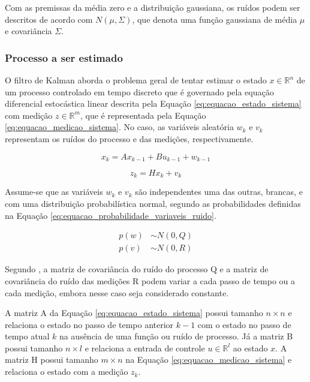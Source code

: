 \documentclass[acronym, symbols, table, deposito]{fei}
\begin{document}
				Com as premissas da média zero e a distribuição gaussiana, os ruídos podem ser descritos de acordo com $N(\mu,\Sigma)$, que denota uma função gaussiana de média $\mu$ e covariância $\Sigma$.
		
		\subsubsection{Processo a ser estimado}
		
			O filtro de Kalman aborda o problema geral de tentar estimar o estado $x \in \mathbb{R}^n$ de um processo controlado em tempo discreto que é governado pela equação diferencial estocástica linear descrita pela Equação \eqref{eq:equacao_estado_sistema} com medição $z \in \mathbb{R}^m$, que é representada pela Equação \eqref{eq:equacao_medicao_sistema}. No caso, as variáveis aleatória $w_k$ e $v_k$ representam os ruídos do processo e das medições, respectivamente.
			
			\begin{equation} \label{eq:equacao_estado_sistema}
				x_k = Ax_{k-1} + Bu_{k-1} + w_{k-1}
			\end{equation}
		
			\begin{equation} \label{eq:equacao_medicao_sistema}
				z_k = Hx_k + v_k
			\end{equation}
		
			Assume-se que as variáveis $w_k$ e $v_k$ são independentes uma das outras, brancas, e com uma distribuição probabilística normal, segundo as probabilidades definidas na Equação \eqref{eq:equacao_probabilidade_variaveis_ruido}.
			
			\begin{equation} \label{eq:equacao_probabilidade_variaveis_ruido}
				\begin{split}
					p(w) &\sim N(0, Q) \\
					p(v) &\sim N(0, R)
				\end{split}
			\end{equation}
		
			Segundo \textcite{welch1995introduction}, a matriz de covariância do ruído do processo Q e a matriz de covariância do ruído das medições R podem variar a cada passo de tempo ou a cada medição, embora nesse caso seja considerado constante.
			
			A matriz A da Equação \eqref{eq:equacao_estado_sistema} possui tamanho $n \times n$ e relaciona o estado no passo de tempo anterior $k - 1$ com o estado no passo de tempo atual $k$ na ausência de uma função ou ruído de processo. Já a matriz B possui tamanho $n \times l$ e relaciona a entrada de controle $u \in \mathbb{R}^l$ ao estado $x$. A matriz H possui tamanho $m \times n$ na Equação \eqref{eq:equacao_medicao_sistema} e relaciona o estado com a medição $z_k$.
			
\end{document}

